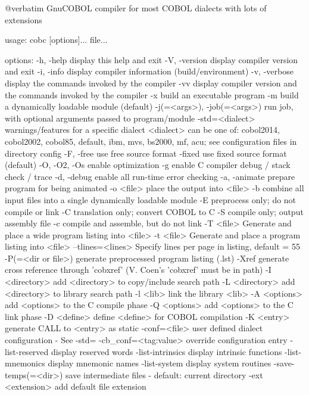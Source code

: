 @verbatim
GnuCOBOL compiler for most COBOL dialects with lots of extensions

usage: cobc [options]... file...

options:
  -h, -help             display this help and exit
  -V, -version          display compiler version and exit
  -i, -info             display compiler information (build/environment)
  -v, -verbose          display the commands invoked by the compiler
  -vv                   display compiler version and the commands
                        invoked by the compiler
  -x                    build an executable program
  -m                    build a dynamically loadable module (default)
  -j(=<args>), -job(=<args>) run job, with optional arguments passed to program/module
  -std=<dialect>        warnings/features for a specific dialect
                        <dialect> can be one of:
                        cobol2014, cobol2002, cobol85, default,
                        ibm, mvs, bs2000, mf, acu;
                        see configuration files in directory config
  -F, -free             use free source format
  -fixed                use fixed source format (default)
  -O, -O2, -Os          enable optimization
  -g                    enable C compiler debug / stack check / trace
  -d, -debug            enable all run-time error checking
  -a, -animate          prepare program for being animated
  -o <file>             place the output into <file>
  -b                    combine all input files into a single
                        dynamically loadable module
  -E                    preprocess only; do not compile or link
  -C                    translation only; convert COBOL to C
  -S                    compile only; output assembly file
  -c                    compile and assemble, but do not link
  -T <file>             Generate and place a wide program listing into <file>
  -t <file>             Generate and place a program listing into <file>
  --tlines=<lines>      Specify lines per page in listing, default = 55
  -P(=<dir or file>)    generate preprocessed program listing (.lst)
  -Xref                 generate cross reference through 'cobxref'
                        (V. Coen's 'cobxref' must be in path)
  -I <directory>        add <directory> to copy/include search path
  -L <directory>        add <directory> to library search path
  -l <lib>              link the library <lib>
  -A <options>          add <options> to the C compile phase
  -Q <options>          add <options> to the C link phase
  -D <define>           define <define> for COBOL compilation
  -K <entry>            generate CALL to <entry> as static
  -conf=<file>          user defined dialect configuration - See -std=
  -cb_conf=<tag:value>  override configuration entry
  -list-reserved        display reserved words
  -list-intrinsics      display intrinsic functions
  -list-mnemonics       display mnemonic names
  -list-system          display system routines
  -save-temps(=<dir>)   save intermediate files
                        - default: current directory
  -ext <extension>      add default file extension

